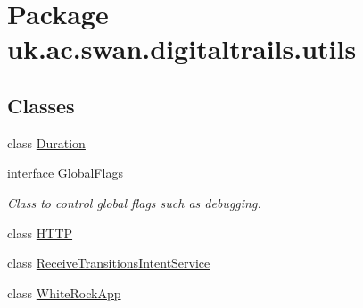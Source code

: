 \hypertarget{namespaceuk_1_1ac_1_1swan_1_1digitaltrails_1_1utils}{\section{Package uk.\+ac.\+swan.\+digitaltrails.\+utils}
\label{namespaceuk_1_1ac_1_1swan_1_1digitaltrails_1_1utils}
}
\subsection*{Classes}
\begin{DoxyCompactItemize}
\item 
class \hyperlink{classuk_1_1ac_1_1swan_1_1digitaltrails_1_1utils_1_1_duration}{Duration}
\item 
interface \hyperlink{interfaceuk_1_1ac_1_1swan_1_1digitaltrails_1_1utils_1_1_global_flags}{Global\+Flags}
\begin{DoxyCompactList}\small\item\em Class to control global flags such as debugging. \end{DoxyCompactList}\item 
class \hyperlink{classuk_1_1ac_1_1swan_1_1digitaltrails_1_1utils_1_1_h_t_t_p}{H\+T\+T\+P}
\item 
class \hyperlink{classuk_1_1ac_1_1swan_1_1digitaltrails_1_1utils_1_1_receive_transitions_intent_service}{Receive\+Transitions\+Intent\+Service}
\item 
class \hyperlink{classuk_1_1ac_1_1swan_1_1digitaltrails_1_1utils_1_1_white_rock_app}{White\+Rock\+App}
\end{DoxyCompactItemize}
